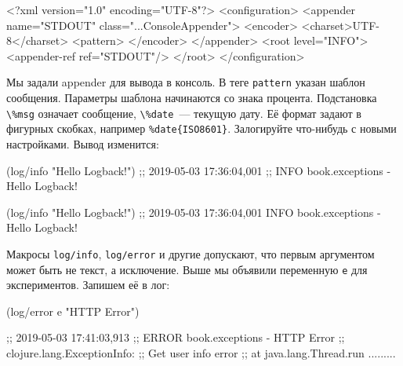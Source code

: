 \else

\begin{english}
  \begin{xml}
<?xml version="1.0" encoding="UTF-8"?>
<configuration>
  <appender name="STDOUT" class="...ConsoleAppender">
    <encoder>
      <charset>UTF-8</charset>
      <pattern>%
    </encoder>
  </appender>
  <root level="INFO">
    <appender-ref ref="STDOUT"/>
  </root>
</configuration>
  \end{xml}
\end{english}

\fi


Мы задали appender для вывода в консоль. В теге \verb|pattern| указан шаблон
сообщения. Параметры шаблона начинаются со знака процента. Подстановка
\verb|\%msg| означает сообщение, \verb|\%date|~--- текущую дату. Её
формат задают в фигурных скобках, например \verb|%date{ISO8601}|. Залогируйте
что-нибудь с новыми настройками. Вывод изменится:

\ifx\devicetype\mobile

\begin{english}
  \begin{clojure}
(log/info "Hello Logback!")
;; 2019-05-03 17:36:04,001
;; INFO book.exceptions - Hello Logback!
  \end{clojure}
\end{english}

\else

\begin{english}
  \begin{clojure}
(log/info "Hello Logback!")
;; 2019-05-03 17:36:04,001 INFO book.exceptions - Hello Logback!
  \end{clojure}
\end{english}

\fi

\label{log-ex-param}

Макросы \verb|log/info|, \verb|log/error| и другие допускают, что первым
аргументом может быть не текст, а исключение. Выше мы объявили переменную
\verb|e| для экспериментов. Запишем её в лог:

\ifx\devicetype\mobile

\begin{english}
  \begin{clojure}
(log/error e "HTTP Error")

;; 2019-05-03 17:41:03,913
;; ERROR book.exceptions - HTTP Error
;; clojure.lang.ExceptionInfo:
;; Get user info error
;; at java.lang.Thread.run .........
  \end{clojure}
\end{english}

